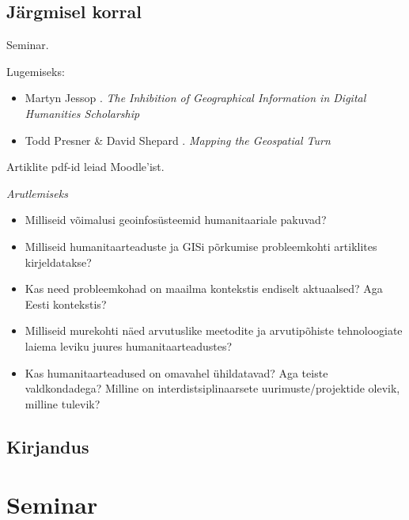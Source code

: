 \documentclass[
]{book}
\providecommand{\tightlist}{%
  \setlength{\itemsep}{0pt}\setlength{\parskip}{0pt}}
\begin{document}
\hypertarget{juxe4rgmisel-korral}{%
\section{Järgmisel korral}\label{juxe4rgmisel-korral}}

Seminar.

Lugemiseks:

\begin{itemize}
\tightlist
\item
  Martyn Jessop \citeyearpar{Jessop2008}. \emph{The Inhibition of Geographical Information in Digital Humanities Scholarship}
\item
  Todd Presner \& David Shepard \citeyearpar{Presner2015}. \emph{Mapping the Geospatial Turn}
\end{itemize}

Artiklite pdf-id leiad Moodle'ist.

\emph{Arutlemiseks}

\begin{itemize}
\tightlist
\item
  Milliseid võimalusi geoinfosüsteemid humanitaariale pakuvad?\\
\item
  Milliseid humanitaarteaduste ja GISi põrkumise probleemkohti artiklites kirjeldatakse?\\
\item
  Kas need probleemkohad on maailma kontekstis endiselt aktuaalsed? Aga Eesti kontekstis?\\
\item
  Milliseid murekohti näed arvutuslike meetodite ja arvutipõhiste tehnoloogiate laiema leviku juures humanitaarteadustes?\\
\item
  Kas humanitaarteadused on omavahel ühildatavad? Aga teiste valdkondadega? Milline on interdistsiplinaarsete uurimuste/projektide olevik, milline tulevik?
\end{itemize}

\hypertarget{kirjandus}{%
\section{Kirjandus}\label{kirjandus}}

\hypertarget{seminar}{%
\chapter{Seminar}\label{seminar}}
\end{document}
